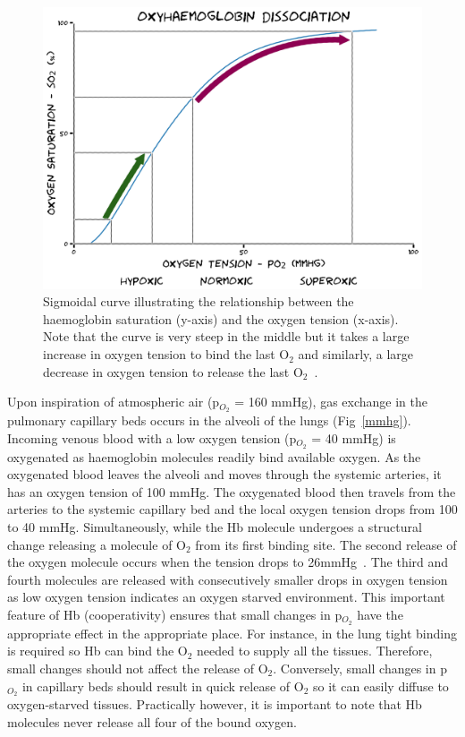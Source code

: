 	\begin{figure}
		\begin{center}
		\includegraphics[width=\textwidth]{./oemri_thesis1/oemri_thesis1-images/Hbdissociation.png}
		\caption{Sigmoidal curve illustrating the relationship between the haemoglobin saturation (y-axis) and the oxygen tension (x-axis). Note that the curve is very steep in the middle but it takes a large increase in oxygen tension to bind the last O$_2$ and similarly, a large decrease in oxygen tension to release the last  O$_2$~\cite{GomezCambronero:2001hu}.}
		\label{HBdis}
		\end{center}
	\end{figure}	

Upon inspiration of atmospheric air (p$_{O_2}$ = 160 mmHg), gas exchange in the pulmonary capillary beds occurs in the alveoli of the lungs (Fig~\ref{mmhg}).
Incoming venous blood with a low oxygen tension (p$_{O_2}$ = 40 mmHg) is oxygenated as haemoglobin molecules readily bind available oxygen. 
As the oxygenated blood leaves the alveoli and moves through the systemic arteries, it has an oxygen tension of 100 mmHg. 
The oxygenated blood then travels from the arteries to the systemic capillary bed and the local oxygen tension drops from 100 to 40 mmHg.
Simultaneously, while the \acs{Hb} molecule undergoes a structural change releasing a molecule of O$_2$ from its first binding site.  
The second release of the oxygen molecule occurs when the tension drops to 26mmHg~\cite{GomezCambronero:2001hu}. 
The third and fourth molecules are released with consecutively smaller drops in oxygen tension as low oxygen tension indicates an oxygen starved environment. This important feature of \acs{Hb} (cooperativity) ensures that small changes in p$_{O_2}$ have the appropriate effect in the appropriate place. 
For instance, in the lung tight binding is required so \acs{Hb} can bind the O$_2$ needed to supply all the tissues.
Therefore, small changes should not affect the release of O$_2$.
Conversely, small changes in p$_{O_2}$ in capillary beds should result in quick release of O$_2$ so it can easily diffuse to oxygen-starved tissues. 
Practically however, it is important to note that \acs{Hb} molecules never release all four of the bound oxygen.

